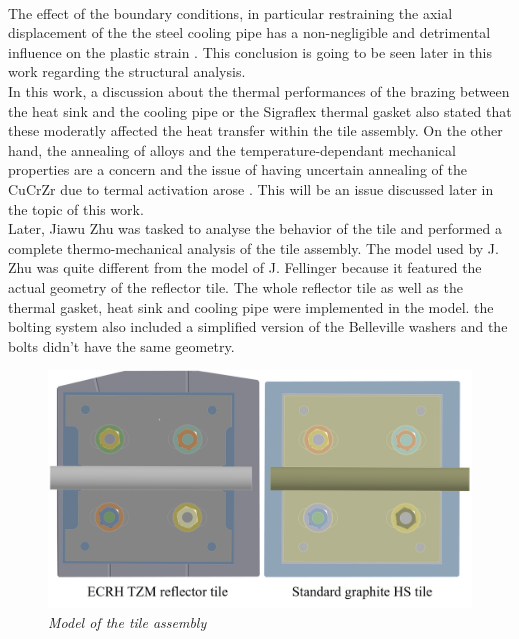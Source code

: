 \\
\break
\normalsize{\indent The effect of the boundary conditions, in particular restraining the axial displacement of the the steel cooling pipe has a non-negligible and detrimental influence on the plastic strain \cites{Fellinger_2013}. This conclusion is going to be seen later in this work regarding the structural analysis.}
\\
\break
\normalsize{\indent In this work, a discussion about the thermal performances of the brazing between the heat sink and the cooling pipe or the Sigraflex thermal gasket also stated that these moderatly affected the heat transfer within the tile assembly. On the other hand, the annealing of alloys and the temperature-dependant mechanical properties are a concern and the issue of having uncertain annealing of the \acrshort{CuCrZr} due to termal activation arose \cites{Fellinger_2013}. This will be an issue discussed later in the topic of this work.}
\\
\break
\normalsize{\indent Later, Jiawu Zhu was tasked to analyse the behavior of the tile and performed a complete thermo-mechanical analysis of the tile assembly. The model used by J. Zhu was quite different from the model of J. Fellinger because it featured the actual geometry of the reflector tile. The whole reflector tile as well as the thermal gasket, heat sink and cooling pipe were implemented in the model. the bolting system also included a simplified version of the Belleville washers and the bolts didn't have the same geometry.}
\begin{figure}[h!]
    \centering
    \includegraphics[width=.81\textwidth]{figures/jZhumodel.png}
    \caption{\it Model of the tile assembly \cite{zhu_parametric_2019}}
    \label{fig:fig_3_5}
\end{figure}
\\
